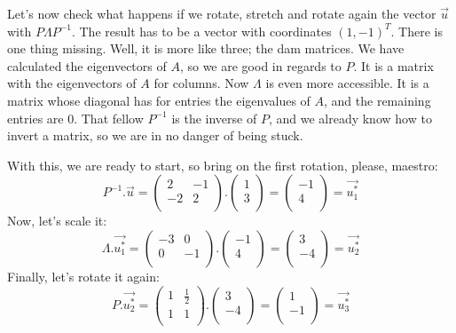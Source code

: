 \documentclass[600paper, 11pt,twoside,openany]{kdp}
\begin{document}
\indent
Let’s now check what happens if we rotate, stretch and rotate again the vector $\overrightarrow{u}$ with $P \Lambda P^{-1}$. The result has to be a vector with coordinates $(1,−1)^T$. There is one thing missing. Well, it is more like three; the dam matrices. We have calculated the eigenvectors of $A$, so we are good in regards to $P$. It is a matrix with the eigenvectors of $A$ for columns. Now $\Lambda$ is even more accessible. It is a matrix whose diagonal has for entries the eigenvalues of $A$, and the remaining entries are 0. That fellow $P^{-1}$ is the inverse of $P$, and we already know how to invert a matrix, so we are in no danger of being stuck.
\par 
\vspace{-3pt}
\indent With this, we are ready to start, so bring on the first rotation, please, maestro:
\[ P^{-1}.\overrightarrow{u} = \begin{pmatrix}
2 & -1 \\
-2 & 2 \\
\end{pmatrix}. \begin{pmatrix}
 1 \\
 3 \\
\end{pmatrix} = \begin{pmatrix}
 -1 \\
 4 \\
\end{pmatrix} = \overrightarrow{u_1^*}\]
\indent Now, let’s scale it:
\[ \Lambda.\overrightarrow{u_1^*} = \begin{pmatrix}
-3 & 0 \\
0 & -1 \\
\end{pmatrix}.\begin{pmatrix}
 -1 \\
 4 \\
\end{pmatrix} = \begin{pmatrix}
 3 \\
 -4 \\
\end{pmatrix} = \overrightarrow{u_2^*}\]
\indent Finally, let’s rotate it again:
\[ P.\overrightarrow{u_2^*} = \begin{pmatrix}
1 & \frac{1}{2} \\
1 & 1 \\
\end{pmatrix}.\begin{pmatrix}
 3 \\
 -4 \\
\end{pmatrix} = \begin{pmatrix}
 1 \\
 -1 \\
\end{pmatrix} = \overrightarrow{u_3^*}\]
\end{document}
